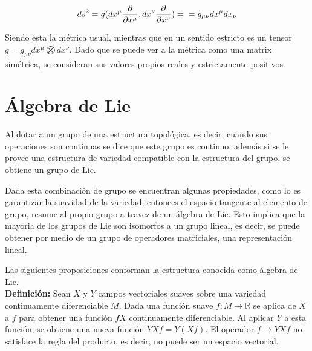 \documentclass{report}
\begin{document}
{\begin{equation}
ds^{2} = g (dx^{\mu} \frac{\partial}{\partial x^{\mu}} , dx ^{\nu} \frac{\partial}{\partial x^{\nu}}) = \\
\\ = g_{\mu \nu} dx^{\mu} dx_{\nu}
\end{equation}

Siendo esta la métrica usual, mientras que en un sentido estricto es un tensor $g = g_{\mu \nu} dx^{\mu} \bigotimes dx^{\nu}$. Dado que se puede ver a la métrica como una matrix simétrica, se consideran sus valores propios reales y estrictamente positivos.\\





\section{\'Algebra de Lie}



Al dotar a un grupo de una estructura topológica, es decir, cuando sus operaciones son continuas se dice que este grupo es continuo, además si se le provee una estructura de variedad compatible con la estructura del grupo, se obtiene un grupo de Lie. 

Dada esta combinación de grupo se encuentran algunas propiedades, como lo es garantizar la suavidad de la variedad, entonces el espacio tangente al elemento de grupo, resume al propio grupo a travez de un álgebra de Lie. Esto implica que la mayoria de los grupos de Lie son isomorfos a un grupo lineal, es decir, se puede obtener por medio de un grupo de operadores matriciales, una representación lineal. 

Las siguientes proposiciones conforman la estructura conocida como álgebra de Lie.\\

\textbf{Definición:} Sean $X$ y $Y$ campos vectoriales suaves sobre una variedad continuamente diferenciable $M$. Dada una función suave $f: M \to \mathbb{R}$ se aplica de $X$ a $f$ para obtener una función $fX$ continuamente diferenciable. Al aplicar $Y$ a esta función, se obtiene una nueva función $YXf = Y(Xf)$. El operador $f \to YXf$ no satisface la regla del producto, es decir, no puede ser un espacio vectorial.\\

}
\end{document}
